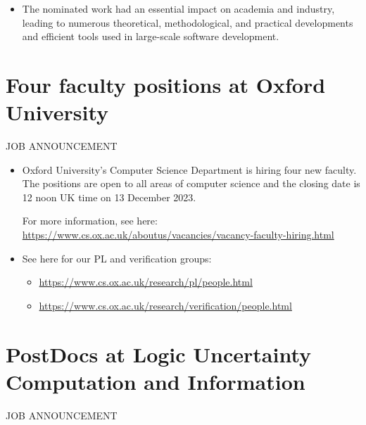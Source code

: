 \documentclass[prodmode,acmtecs]{acmsmall} %
\begin{document}
\begin{itemize}
\item  The nominated work had an essential impact on academia and industry, leading to numerous theoretical, methodological, and practical developments and efficient tools used in large-scale software development. 
 
\end{itemize}\section{Four faculty positions at Oxford University}\label{FourfacultypositionsatOxfordUniversity}JOB ANNOUNCEMENT 

\begin{itemize}\item  Oxford University’s Computer Science Department is hiring four new faculty. The positions are open to all areas of computer science and the closing date is 12 noon UK time on 13 December 2023.  
 
  For more information, see here: \href{https://www.cs.ox.ac.uk/aboutus/vacancies/vacancy-faculty-hiring.html}{https://www.cs.ox.ac.uk/aboutus/vacancies/vacancy-faculty-hiring.html} 
 
\item  See here for our PL and verification groups: 
 
\begin{itemize}\item  \href{https://www.cs.ox.ac.uk/research/pl/people.html}{https://www.cs.ox.ac.uk/research/pl/people.html}
\item  \href{https://www.cs.ox.ac.uk/research/verification/people.html}{https://www.cs.ox.ac.uk/research/verification/people.html}
\end{itemize} 
\end{itemize}\section{PostDocs at Logic Uncertainty Computation and Information}\label{PostDocsatLogicUncertaintyComputationandInformation}JOB ANNOUNCEMENT 
\end{document}
